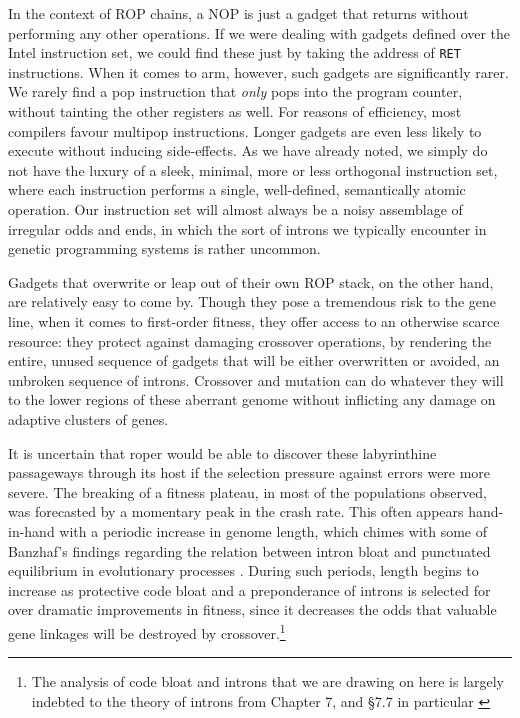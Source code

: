 \documentclass[12pt,glossary]{dalthesis}
\begin{document}
In the context of ROP chains, a NOP is just a gadget that returns without
performing any other operations. If we were dealing with gadgets defined over
the Intel instruction set, we could find these just by taking the address of
\texttt{RET} instructions. When it comes to \gls{arm}, however, such gadgets are
significantly rarer. We rarely find a pop instruction that \emph{only} pops into the
program counter, without tainting the other registers as well. For reasons of
efficiency, most compilers favour multipop instructions. Longer gadgets are even
less likely to execute without inducing side-effects. As we have already noted,
we simply do not have the luxury of a sleek, minimal, more or less orthogonal
instruction set, where each instruction performs a single, well-defined,
semantically atomic operation. Our instruction set will almost always be a noisy
assemblage of irregular odds and ends, in which the sort of introns we typically
encounter in genetic programming systems is rather uncommon.

Gadgets that overwrite or leap out of their own ROP stack, on the other hand,
are relatively easy to come by. Though they pose a tremendous risk to the gene
line, when it comes to first-order fitness, they offer access to an otherwise
scarce resource: they protect against damaging crossover operations, by
rendering the entire, unused sequence of gadgets that will be either overwritten
or avoided, an unbroken sequence of introns. Crossover and mutation can do
whatever they will to the lower regions of these aberrant genome without
inflicting any damage on adaptive clusters of genes.

It is uncertain that \gls{roper} would be able to discover these labyrinthine
passageways through its host if the selection pressure against errors
were more severe. The breaking of a fitness plateau, in most of the populations
observed, was forecasted by a momentary peak in the crash rate. This often
appears hand-in-hand with a periodic increase in genome length, which chimes
with some of Banzhaf's findings regarding the relation between intron bloat
and punctuated equilibrium in evolutionary processes \cite{banzhaf98}.
During such periods, length begins to increase as protective code bloat
and a preponderance of introns is selected for over dramatic improvements in
fitness, since it decreases the odds that valuable gene linkages will be
destroyed by crossover.\footnote{The analysis of code bloat and introns that we are drawing on here is
  largely indebted to the theory of introns from Chapter 7, and \S 7.7 in
  particular \cite{brameier07}}
\end{document}
